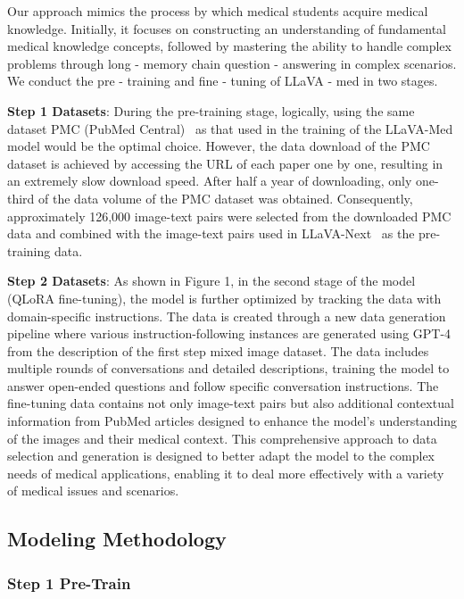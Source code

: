 \documentclass[10pt,letterpaper]{article}
\begin{document}
Our approach mimics the process by which medical students acquire medical knowledge. Initially, it focuses on constructing an understanding of fundamental medical knowledge concepts, followed by mastering the ability to handle complex problems through long - memory chain question - answering in complex scenarios. We conduct the pre - training and fine - tuning of LLaVA - med in two stages.


\textbf{Step 1 Datasets}: During the pre-training stage, logically, using the same dataset PMC (PubMed Central)~\cite{lin2023pmc} as that used in the training of the LLaVA-Med model would be the optimal choice. However, the data download of the PMC dataset is achieved by accessing the URL of each paper one by one, resulting in an extremely slow download speed. After half a year of downloading, only one-third of the data volume of the PMC dataset was obtained. Consequently, approximately 126,000 image-text pairs were selected from the downloaded PMC data and combined with the image-text pairs used in LLaVA-Next~\cite{liu2024llavanext} as the pre-training data.

\textbf{Step 2 Datasets}: As shown in Figure 1, in the second stage of the model (QLoRA fine-tuning), the model is further optimized by tracking the data with domain-specific instructions. The data is created through a new data generation pipeline where various instruction-following instances are generated using GPT-4 from the description of the first step mixed image dataset. The data includes multiple rounds of conversations and detailed descriptions, training the model to answer open-ended questions and follow specific conversation instructions. The fine-tuning data contains not only image-text pairs but also additional contextual information from PubMed articles designed to enhance the model's understanding of the images and their medical context. This comprehensive approach to data selection and generation is designed to better adapt the model to the complex needs of medical applications, enabling it to deal more effectively with a variety of medical issues and scenarios.

\subsection*{Modeling Methodology}

\subsubsection*{Step 1 Pre-Train}
\end{document}
